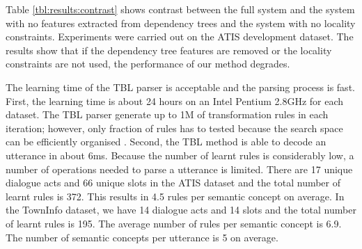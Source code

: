 \documentclass{article}
\newcommand{\efgr}[2]{
  \begin{figure}[htbp]
    \makebox[8.5cm]{\framebox[5cm]{\rule{0pt}{5cm}}}
    \caption{#2}
    \label{#1}
  \end{figure}
}
\begin{document}



Table \ref{tbl:results:contrast} shows contrast between the full system and the system with no features extracted from dependency trees and the system with no locality constraints. Experiments were carried out on the ATIS development dataset. The results show that if the dependency tree features are removed or the locality constraints are not used, the performance of our method degrades.

The learning time of the TBL parser is acceptable and the parsing process is fast. 
First, the learning time is about 24 hours on an Intel Pentium 2.8GHz for each dataset. The TBL parser generate up to 1M of transformation rules in each iteration; however, only fraction of rules has to tested because the search space can be efficiently organised \cite{brill95}.
Second, the TBL method is able to decode an utterance in about 6ms. Because the number of learnt rules is considerably low, a number of operations needed to parse a utterance is limited. There are 17 unique dialogue acts and 66 unique slots in the ATIS dataset and the total number of learnt rules is 372. This results in 4.5 rules per semantic concept on average. In the TownInfo dataset, we have 14 dialogue acts and 14 slots and the total number of learnt rules is 195. The average number of rules per semantic concept is 6.9. The number of semantic concepts per utterance is 5 on average.
\end{document}
